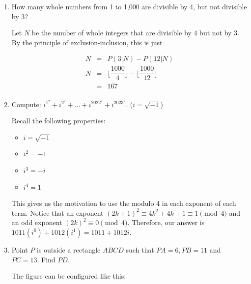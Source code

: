 \documentclass[11pt,paper={letter}]{scrartcl}
\begin{document}
\begin{enumerate}[label=\textbf{\arabic*}.]
\item How many whole numbers from 1 to 1,000 are divisible by 4, but not divisible by 3?


\sol Let $N$ be the number of whole integers that are divisible by 4 but not by 3. By the principle of exclusion-inclusion, this is just 

\begin{equation*}
    \begin{array}{rcl}

    N &=& P(3|N) - P(12|N)\\
        N & = & \bigg \lfloor \dfrac{1000}{4} \bigg \rfloor - \bigg \lfloor \dfrac{1000}{12} \bigg \rfloor   \\

        &=& 167 \\
         
    \end{array}
\end{equation*}

\item Compute: $i^{1^2} + i^{2^2} + \ldots +i^{2022^2}+ i^{2023^2}$. ($i = \sqrt{-1}$)


\sol Recall the following properties:

\begin{itemize}
    \item $i = \sqrt{-1}$
    \item $i^2 = {-1}$
    \item $i^3 = -i$
    \item $i^4 = 1$
\end{itemize}

This gives us the motivation to use the modulo 4 in each exponent of each term. Notice that an exponent $(2k+1)^2  \equiv 4k^2 + 4k + 1 \equiv 1\pmod{4}$ and an odd exponent $(2k)^2 \equiv 0 \pmod{4}.$ Therefore, our answer is $1011(i^0) + 1012(i^1) = \boxed{1011 + 1012i.}$
\item Point $P$ is outside a rectangle $ABCD$ such that $PA = 6, PB = 11$ and $PC = 13$. Find $PD$.



 The figure can be configured like this:

\begin{center}
    



\end{center}
\end{enumerate}
\end{document}
